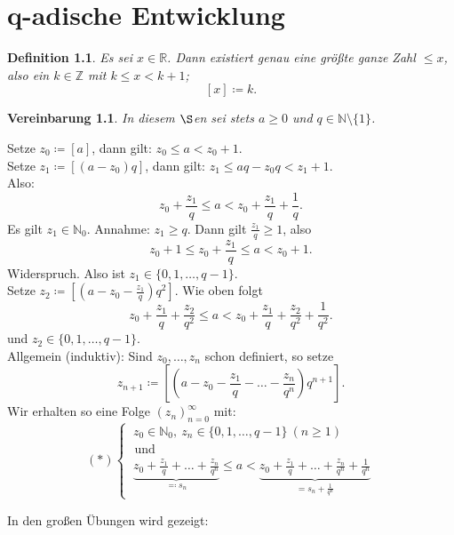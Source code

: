 \documentclass[12pt]{extreport} %
\newcommand{\N}{\mathbb{N}}
\newcommand{\R}{\mathbb{R}}
\newcommand{\Z}{\mathbb{Z}}
\theoremstyle{named}
\theoremstyle{itshape}
\newtheorem*{definition}{Definition}
\theoremstyle{normal}
\newtheorem*{vereinbarung}{Vereinbarung}
\begin{document}
\newpage


\chapter{q-adische Entwicklung}

\begin{definition}
	Es sei $x \in \R$. Dann existiert genau eine grö{\ss}te ganze Zahl $\le x$, also ein $k \in \Z$ mit $k \leq x < k + 1$; 
		$$ [x] \coloneqq k. $$
	
\end{definition}


\begin{vereinbarung}
	In diesem $\S$en sei stets $a \geq 0$ und $q \in \N\setminus \{1\}$.
\end{vereinbarung}


Setze $z_{0} \coloneqq [a]$, dann gilt: $z_{0} \leq a < z_{0} + 1$. \\
Setze $z_{1} \coloneqq [(a-z_{0})q]$, dann gilt: $z_{1} \leq aq - z_{0}q < z_{1} + 1$. \\
Also: 
       $$ z_{0} + \frac{z_{1}}{q} \leq a < z_{0} + \frac{z_{1}}{q} + \frac{1}{q}. $$
Es gilt $z_{1} \in \N_{0}$.  Annahme: $z_{1} \geq q$. Dann gilt  $\frac{z_{1}}{q} \geq 1$, also
	$$ z_{0} + 1 \leq z_{0} + \frac{z_{1}}{q} \leq a < z_{0} +1. $$
Widerspruch. Also ist $z_{1} \in \{ 0, 1, \dotsc, q - 1 \}$. \\
Setze  $z_{2} \coloneqq [(a-z_{0}-\frac{z_{1}}{q})q^{2}]$. Wie oben folgt
	$$ z_{0} + \frac{z_{1}}{q} + \frac{z_{2}}{q^{2}} \leq a < z_{0} + \frac{z_{1}}{q} + \frac{z_{2}}{q^{2}} + \frac{1}{q^{2}}. $$
und $z_{2} \in \{ 0, 1, \dotsc, q - 1 \}$. \\
Allgemein (induktiv): Sind $z_{0}, \dotsc, z_{n}$ schon definiert, so setze
	$$ z_{n+1} \coloneqq [(a - z_{0} - \frac{z_{1}}{q} - \dotsc - \frac{z_{n}}{q^{n}}) q^{n+1}]. $$
Wir erhalten so eine Folge $(z_{n})_{n=0}^{\infty}$ mit:
	$$ (*) \begin{cases} ~ z_{0} \in \N_{0},  ~ z_{n} \in \{ 0, 1, \dotsc, q - 1 \} ~ (n \geq 1) \\ 
	\text{ und} \\ ~\underbrace{z_{0} + \frac{z_{1}}{q} + \dotsc + \frac{z_{n}}{q^{n}}}_{\eqqcolon s_{n}} \leq a 
	< \underbrace{ z_{0} + \frac{z_{1}}{q} + \dotsc + \frac{z_{n}}{q^{n}} + \frac{1}{q^{n}}}_{= s_{n} + \frac{1}{q^{n}}} \end{cases} $$


In den gro{\ss}en Übungen wird gezeigt:
\end{document}
